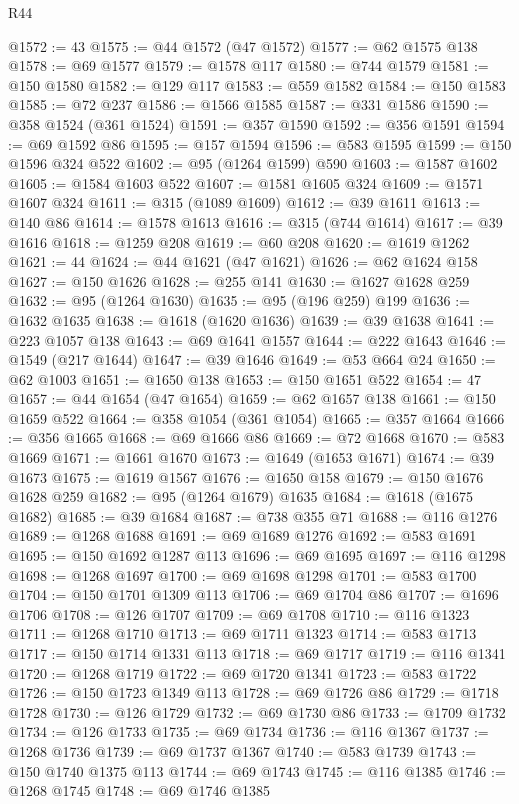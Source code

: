 \begin{lexlean}{R44}
\begin{coremodule}
@1572 := 43
@1575 := @44 @1572 (@47 @1572)
@1577 := @62 @1575 @138
@1578 := @69 @1577
@1579 := @1578 @117
@1580 := @744 @1579
@1581 := @150 @1580
@1582 := @129 @117
@1583 := @559 @1582
@1584 := @150 @1583
@1585 := @72 @237
@1586 := @1566 @1585
@1587 := @331 @1586
@1590 := @358 @1524 (@361 @1524)
@1591 := @357 @1590
@1592 := @356 @1591
@1594 := @69 @1592 @86
@1595 := @157 @1594
@1596 := @583 @1595
@1599 := @150 @1596 @324 @522
@1602 := @95 (@1264 @1599) @590
@1603 := @1587 @1602
@1605 := @1584 @1603 @522
@1607 := @1581 @1605 @324
@1609 := @1571 @1607 @324
@1611 := @315 (@1089 @1609)
@1612 := @39 @1611
@1613 := @140 @86
@1614 := @1578 @1613
@1616 := @315 (@744 @1614)
@1617 := @39 @1616
@1618 := @1259 @208
@1619 := @60 @208
@1620 := @1619 @1262
@1621 := 44
@1624 := @44 @1621 (@47 @1621)
@1626 := @62 @1624 @158
@1627 := @150 @1626
@1628 := @255 @141
@1630 := @1627 @1628 @259
@1632 := @95 (@1264 @1630)
@1635 := @95 (@196 @259) @199
@1636 := @1632 @1635
@1638 := @1618 (@1620 @1636)
@1639 := @39 @1638
@1641 := @223 @1057 @138
@1643 := @69 @1641 @1557
@1644 := @222 @1643
@1646 := @1549 (@217 @1644)
@1647 := @39 @1646
@1649 := @53 @664 @24
@1650 := @62 @1003
@1651 := @1650 @138
@1653 := @150 @1651 @522
@1654 := 47
@1657 := @44 @1654 (@47 @1654)
@1659 := @62 @1657 @138
@1661 := @150 @1659 @522
@1664 := @358 @1054 (@361 @1054)
@1665 := @357 @1664
@1666 := @356 @1665
@1668 := @69 @1666 @86
@1669 := @72 @1668
@1670 := @583 @1669
@1671 := @1661 @1670
@1673 := @1649 (@1653 @1671)
@1674 := @39 @1673
@1675 := @1619 @1567
@1676 := @1650 @158
@1679 := @150 @1676 @1628 @259
@1682 := @95 (@1264 @1679) @1635
@1684 := @1618 (@1675 @1682)
@1685 := @39 @1684
@1687 := @738 @355 @71
@1688 := @116 @1276
@1689 := @1268 @1688
@1691 := @69 @1689 @1276
@1692 := @583 @1691
@1695 := @150 @1692 @1287 @113
@1696 := @69 @1695
@1697 := @116 @1298
@1698 := @1268 @1697
@1700 := @69 @1698 @1298
@1701 := @583 @1700
@1704 := @150 @1701 @1309 @113
@1706 := @69 @1704 @86
@1707 := @1696 @1706
@1708 := @126 @1707
@1709 := @69 @1708
@1710 := @116 @1323
@1711 := @1268 @1710
@1713 := @69 @1711 @1323
@1714 := @583 @1713
@1717 := @150 @1714 @1331 @113
@1718 := @69 @1717
@1719 := @116 @1341
@1720 := @1268 @1719
@1722 := @69 @1720 @1341
@1723 := @583 @1722
@1726 := @150 @1723 @1349 @113
@1728 := @69 @1726 @86
@1729 := @1718 @1728
@1730 := @126 @1729
@1732 := @69 @1730 @86
@1733 := @1709 @1732
@1734 := @126 @1733
@1735 := @69 @1734
@1736 := @116 @1367
@1737 := @1268 @1736
@1739 := @69 @1737 @1367
@1740 := @583 @1739
@1743 := @150 @1740 @1375 @113
@1744 := @69 @1743
@1745 := @116 @1385
@1746 := @1268 @1745
@1748 := @69 @1746 @1385

\end{coremodule}
\end{lexlean}
